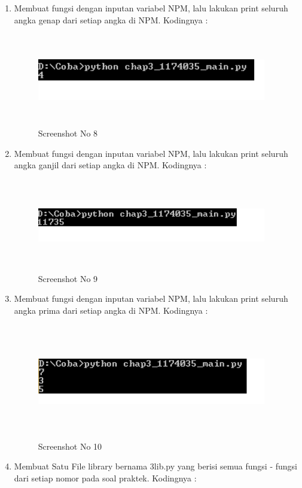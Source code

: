 \begin{enumerate}
\begin{figure}[!htbp]
        \label{1174035_7}
	\end{figure}
	\item Membuat fungsi dengan inputan variabel NPM, lalu lakukan print seluruh angka genap dari setiap angka di NPM. Kodingnya : 
	
	\begin{figure}[!htbp]
        \centering
        \includegraphics[height=4cm, width=10cm]{figures/chapter3/1174035_8.png}
        \caption{Screenshot No 8}
        \label{1174035_8}
	\end{figure}
	\item Membuat fungsi dengan inputan variabel NPM, lalu lakukan print seluruh angka ganjil dari setiap angka di NPM. Kodingnya : 
	
	\begin{figure}[!htbp]
        \centering
        \includegraphics[height=4cm, width=10cm]{figures/chapter3/1174035_9.png}
        \caption{Screenshot No 9}
        \label{1174035_9}
	\end{figure}
	\item Membuat fungsi dengan inputan variabel NPM, lalu lakukan print seluruh angka prima dari setiap angka di NPM. Kodingnya : 
	
	\begin{figure}[!htbp]
        \centering
        \includegraphics[height=5cm, width=10cm]{figures/chapter3/1174035_10.png}
        \caption{Screenshot No 10}
        \label{1174035_10}
	\end{figure}
	\item Membuat Satu File library bernama 3lib.py yang berisi semua fungsi - fungsi dari setiap nomor pada soal praktek. Kodingnya : 	
	
	
	

\end{enumerate}

